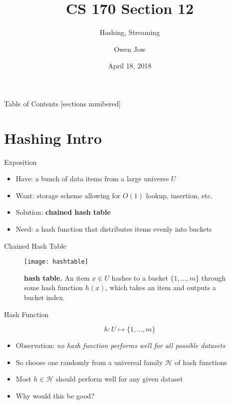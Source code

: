 \documentclass[10pt]{beamer}
\title{CS 170 Section 12}
\subtitle{Hashing, Streaming}
\date{April 18, 2018}
\author{Owen Jow}
\institute{University of California, Berkeley}
\begin{document}
\maketitle

\begin{frame}{Table of Contents}
  [sections numbered]
  \tableofcontents[hideallsubsections]
\end{frame}

\section{Hashing Intro}

\begin{frame}[fragile]{Exposition}

\begin{itemize}
\item Have: a bunch of data items from a large universe $U$
\item Want: storage scheme allowing for $O(1)$ lookup, insertion, etc.
\item Solution: \textbf{chained hash table}
\item Need: a hash function that distributes items evenly into buckets
\end{itemize}

\end{frame}

\begin{frame}[fragile]{Chained Hash Table}

\begin{figure}
  \texttt{[image: hashtable]}
  \caption{\textbf{hash table.} An item $x \in U$ hashes to a bucket $\{1, ..., m\}$ through some hash function $h(x)$, which takes an item and outputs a bucket index.}
\end{figure}

\end{frame}

\begin{frame}[fragile]{Hash Function}

$$h: U \mapsto \{1, ..., m\}$$
\begin{itemize}
\item Observation: \textit{no hash function performs well for all possible datasets}
\item So choose one randomly from a universal family $\mathcal{H}$ of hash functions
\item Most $h \in \mathcal{H}$ should perform well for any given dataset
\item Why would this be good?
\end{itemize}

\end{frame}
\end{document}
